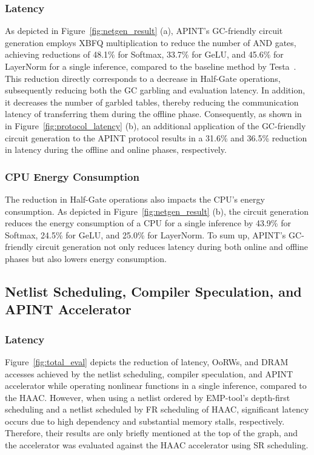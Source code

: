 \subsubsection{\textbf{Latency}}
As depicted in Figure~\ref{fig:netgen_result} (a), APINT's GC-friendly circuit generation employs XBFQ multiplication to reduce the number of AND gates, achieving reductions of 48.1\% for Softmax, 33.7\% for GeLU, and 45.6\% for LayerNorm for a single inference, compared to the baseline method by Testa~\cite{testa2020logic}. This reduction directly corresponds to a decrease in Half-Gate operations, subsequently reducing both the GC garbling and evaluation latency. In addition, it decreases the number of garbled tables, thereby reducing the communication latency of transferring them during the offline phase. Consequently, as shown in  in Figure~\ref{fig:protocol_latency} (b), an additional application of the GC-friendly circuit generation to the APINT protocol results in a 31.6\% and 36.5\% reduction in latency during the offline and online phases, respectively.

\subsubsection{\textbf{CPU Energy Consumption}}
The reduction in Half-Gate operations also impacts the CPU's energy consumption. As depicted in Figure~\ref{fig:netgen_result} (b), the circuit generation reduces the energy consumption of a CPU for a single inference by 43.9\% for Softmax, 24.5\% for GeLU, and 25.0\% for LayerNorm. To sum up, APINT's GC-friendly circuit generation not only reduces latency during both online and offline phases but also lowers energy consumption.

\subsection{Netlist Scheduling, Compiler Speculation, and APINT Accelerator}

\subsubsection{\textbf{Latency}}
Figure~\ref{fig:total_eval} depicts the reduction of latency, OoRWs, and DRAM accesses achieved by the netlist scheduling, compiler speculation, and APINT accelerator while operating nonlinear functions in a single inference, compared to the HAAC. However, when using a netlist ordered by EMP-tool's depth-first scheduling and a netlist scheduled by FR scheduling of HAAC, significant latency occurs due to high dependency and substantial memory stalls, respectively. Therefore, their results are only briefly mentioned at the top of the graph, and the \sysname accelerator was evaluated against the HAAC accelerator using SR scheduling.

